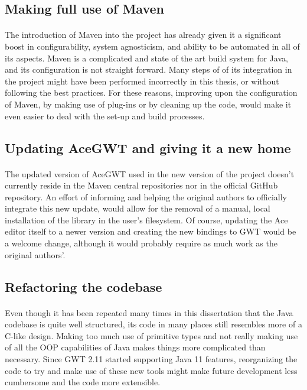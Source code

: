 \subsection{Making full use of Maven}
\paragraph{}
The introduction of Maven into the project has already given it a significant boost in configurability, system agnosticism, and ability to be automated in all of its aspects. Maven is a complicated and state of the art build system for Java, and its configuration is not straight forward. Many steps of of its integration in the project might have been performed incorrectly in this thesis, or without following the best practices. For these reasons, improving upon the configuration of Maven, by making use of plug-ins or by cleaning up the code, would make it even easier to deal with the set-up and build processes.
\subsection{Updating AceGWT and giving it a new home}
\paragraph{}
The updated version of AceGWT used in the new version of the project doesn't currently reside in the Maven central repositories nor in the official GitHub repository. An effort of informing and helping the original authors to officially integrate this new update, would allow for the removal of a manual, local installation of the library in the user's filesystem. Of course, updating the Ace editor itself to a newer version and creating the new bindings to GWT would be a welcome change, although it would probably require as much work as the original authors'.
\subsection{Refactoring the codebase}
\paragraph{}
Even though it has been repeated many times in this dissertation that the Java codebase is quite well structured, its code in many places still resembles more of a C-like design. Making too much use of primitive types and not really making use of all the OOP capabilities of Java makes things more complicated than necessary. Since GWT 2.11 started supporting Java 11 features, reorganizing the code to try and make use of these new tools might make future development less cumbersome and the code more extensible.
